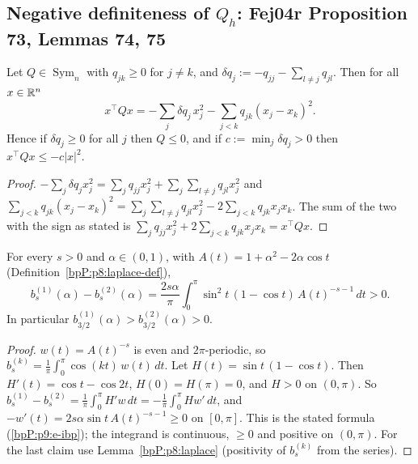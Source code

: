\subsection{Negative definiteness of $Q_h$: Fej04r Proposition 73, Lemmas 74, 75}\label{bpP:p9:sec-def}

\begin{lemma}\label{bpP:p9:l75}
Let $Q\in\operatorname{Sym}_n$ with $q_{jk}\ge0$ for $j\ne k$, and $\delta q_j:=-q_{jj}-\sum_{l\ne j}q_{jl}$. Then for all $x\in\mathbb{R}^n$
\[x^\top Qx=-\sum_j\delta q_j\,x_j^2-\sum_{j<k}q_{jk}(x_j-x_k)^2 .\]
Hence if $\delta q_j\ge0$ for all $j$ then $Q\le0$, and if $c:=\min_j\delta q_j>0$ then $x^\top Qx\le-c\lvert x\rvert^2$.
\end{lemma}
\begin{proof}
\label{stepP:p9:l75} $-\sum_j\delta q_jx_j^2=\sum_jq_{jj}x_j^2+\sum_{j}\sum_{l\ne j}q_{jl}x_j^2$ and $\sum_{j<k}q_{jk}(x_j-x_k)^2=\sum_j\sum_{l\ne j}q_{jl}x_j^2-2\sum_{j<k}q_{jk}x_jx_k$. The sum of the two with the sign as stated is $\sum_jq_{jj}x_j^2+2\sum_{j<k}q_{jk}x_jx_k=x^\top Qx$.
\end{proof}

\begin{lemma}\label{bpP:p9:l74}
For every $s>0$ and $\alpha\in(0,1)$, with $A(t)=1+\alpha^2-2\alpha\cos t$ (Definition~\ref{bpP:p8:laplace-def}),
\[b_s^{(1)}(\alpha)-b_s^{(2)}(\alpha)=\frac{2s\alpha}{\pi}\int_0^\pi\sin^2t\,(1-\cos t)\,A(t)^{-s-1}\,dt>0.\]
In particular $b_{3/2}^{(1)}(\alpha)>b_{3/2}^{(2)}(\alpha)>0$.
\end{lemma}
\begin{proof}
\label{stepP:p9:l74-red} $w(t)=A(t)^{-s}$ is even and $2\pi$-periodic, so $b_s^{(k)}=\frac1\pi\int_0^\pi\cos(kt)\,w(t)\,dt$.
\label{stepP:p9:l74-ibp} Let $H(t)=\sin t\,(1-\cos t)$. Then $H'(t)=\cos t-\cos2t$, $H(0)=H(\pi)=0$, and $H>0$ on $(0,\pi)$. So $b_s^{(1)}-b_s^{(2)}=\frac1\pi\int_0^\pi H'w\,dt=-\frac1\pi\int_0^\pi Hw'\,dt$, and $-w'(t)=2s\alpha\sin t\,A(t)^{-s-1}\ge0$ on $[0,\pi]$. This is the stated formula (\ref{bpP:p9:e-ibp}); the integrand is continuous, $\ge0$ and positive on $(0,\pi)$. For the last claim use Lemma~\ref{bpP:p8:laplace} (positivity of $b_s^{(k)}$ from the series).
\end{proof}

